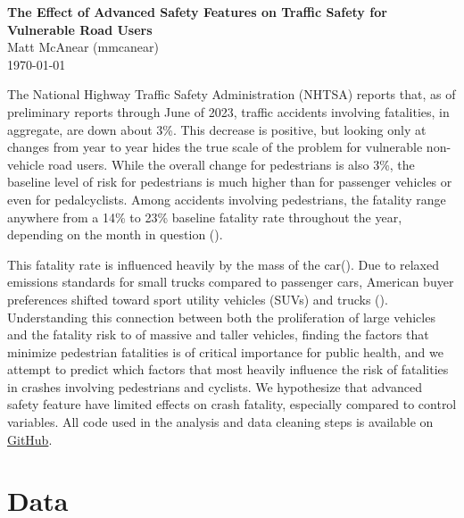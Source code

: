 \documentclass[12pt]{article}
\begin{document}
\begin{flushleft}
\textbf{The Effect of Advanced Safety Features on Traffic Safety for Vulnerable Road Users} \\
Matt McAnear (mmcanear) \\
\today
\end{flushleft}

\vspace{0.1in}

\normalsize

The National Highway Traffic Safety Administration (NHTSA) reports that, as of preliminary reports through
June of 2023, traffic accidents involving fatalities, in aggregate, are down about 3\%. This decrease is positive,
but looking only at changes from year to year hides the true scale of the problem for vulnerable non-vehicle
road users. While the overall change for pedestrians is also 3\%, the baseline level of risk for pedestrians is
much higher than for passenger vehicles or even for pedalcyclists. Among accidents involving pedestrians, the fatality
range anywhere from a 14\% to 23\% baseline fatality rate throughout the year, depending on the month in
question (\cite{national_highway_traffic_safety_administration_early_2024}).


This fatality rate is influenced heavily by the mass of the car(\cite{evans_car_1992}). 
Due to relaxed emissions standards for small trucks compared to passenger cars,
American buyer preferences shifted toward sport utility vehicles (SUVs) and trucks (\cite{kovach_rise_2021}). Understanding this connection between both the proliferation of large vehicles and the fatality risk to
of massive and taller vehicles\cite{tyndall_effect_2024}, finding the factors that minimize pedestrian fatalities
is of critical importance for public health, and we attempt to predict which factors that most heavily influence the risk of fatalities in crashes involving pedestrians
and cyclists. We hypothesize that advanced safety feature have limited effects on crash fatality, 
especially compared to control variables. All code used in the analysis and data cleaning steps is available on
\href{https://github.com/mcanearm/road_fatilities}{GitHub}.


\section{Data}
\end{document}
